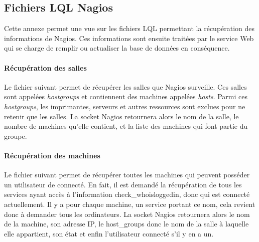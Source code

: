 \begin{appendices}

\chapter{Fichiers LQL Nagios}
\label{annexe:fichiersLQLNagios}

Cette annexe permet une vue sur les fichiers LQL permettant la r\'ecup\'eration des informations de Nagios. 
Ces informations sont ensuite trait\'ees par le service Web qui se charge de remplir ou actualiser la base de donn\'ees en cons\'equence.

\subsubsection{R\'ecup\'eration des salles}

Le fichier suivant permet de r\'ecup\'erer les salles que Nagios surveille.
Ces salles sont appel\'ees \textit{hostgroups} et contiennent des machines appel\'ees \textit{hosts}.
Parmi ces \textit{hostgroups}, les imprimantes, serveurs et autres ressources sont exclues pour ne retenir que les salles.
La socket Nagios retournera alors le nom de la salle, le nombre de machines qu'elle contient, et la liste des machines qui font partie du groupe.

\vspace{0.20cm}



\subsubsection{R\'ecup\'eration des machines}

Le fichier suivant permet de r\'ecup\'erer toutes les machines qui peuvent poss\'eder un utilisateur de connect\'e.
En fait, il est demand\'e la r\'ecup\'eration de tous les services ayant acc\`es \`a l'information \textsf{check\_whoisloggedin}, donc qui est connect\'e actuellement.
Il y a pour chaque machine, un service portant ce nom, cela revient donc \`a demander tous les ordinateurs.
La socket Nagios retournera alors le nom de la machine, son adresse IP, le \textsf{host\_groups} donc le nom de la salle \`a laquelle elle appartient, son \'etat et enfin l'utilisateur connect\'e s'il y en a un.

\clearpage


\end{appendices}
